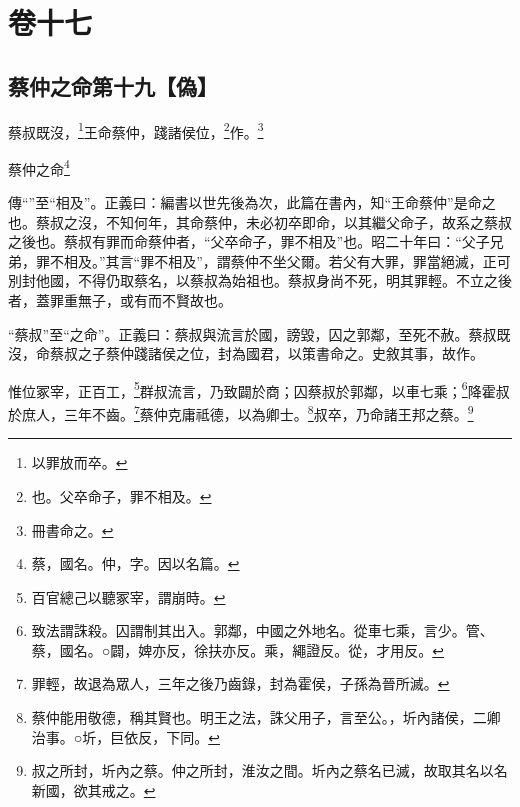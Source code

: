 

\chapter{卷十七}


\section{蔡仲之命第十九【偽】}


蔡叔既沒，\footnote{以罪放而卒。}王命蔡仲，踐諸侯位，\footnote{也。父卒命子，罪不相及。}作。\footnote{冊書命之。}

蔡仲之命\footnote{蔡，國名。仲，字。因以名篇。}


{\noindent\zhuan{}\fzbyks 傳“”至“相及”。正義曰：編書以世先後為次，此篇在書內，知“王命蔡仲”是命之也。蔡叔之沒，不知何年，其命蔡仲，未必初卒即命，以其繼父命子，故系之蔡叔之後也。蔡叔有罪而命蔡仲者，“父卒命子，罪不相及”也。昭二十年曰：“父子兄弟，罪不相及。”其言“罪不相及”，謂蔡仲不坐父爾。若父有大罪，罪當絕滅，正可別封他國，不得仍取蔡名，以蔡叔為始祖也。蔡叔身尚不死，明其罪輕。不立之後者，蓋罪重無子，或有而不賢故也。 \par}

{\noindent\shu{}\fzkt “蔡叔”至“之命”。正義曰：蔡叔與流言於國，謗毀，囚之郭鄰，至死不赦。蔡叔既沒，命蔡叔之子蔡仲踐諸侯之位，封為國君，以策書命之。史敘其事，故作。 \par}

惟位冢宰，正百工，\footnote{百官總己以聽冢宰，謂崩時。}群叔流言，乃致闢於商；囚蔡叔於郭鄰，以車七乘；\footnote{致法謂誅殺。囚謂制其出入。郭鄰，中國之外地名。從車七乘，言少。管、蔡，國名。○闢，婢亦反，徐扶亦反。乘，繩證反。從，才用反。}降霍叔於庶人，三年不齒。\footnote{罪輕，故退為眾人，三年之後乃齒錄，封為霍侯，子孫為晉所滅。}蔡仲克庸祗德，以為卿士。\footnote{蔡仲能用敬德，稱其賢也。明王之法，誅父用子，言至公。，圻內諸侯，二卿治事。○圻，巨依反，下同。}叔卒，乃命諸王邦之蔡。\footnote{叔之所封，圻內之蔡。仲之所封，淮汝之間。圻內之蔡名已滅，故取其名以名新國，欲其戒之。}


